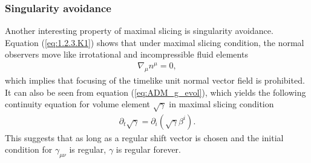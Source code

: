 \subsubsection{Singularity avoidance}
Another interesting property of maximal slicing is singularity avoidance.
Equation (\ref{eq:1.2.3.K1}) shows that under maximal slicing condition,
the normal observers move like irrotational and incompressible fluid elements
\begin{align}
    \nabla_\mu n^{\mu} = 0,
\end{align}
which implies that focusing of the timelike unit normal vector field is prohibited.
It can also be seen from equation (\ref{eq:ADM_g_evol}),
which yields the following continuity equation for volume element $\sqrt{\gamma}$ in maximal slicing condition
\begin{align}\label{eq:volume_evol}
    \partial_t \sqrt{\gamma} = \partial_i \left( \sqrt{\gamma} \beta^i \right).
\end{align}
This suggests that as long as a regular shift vector is chosen
and the initial condition for $\gamma_{\mu\nu}$ is regular,
$\gamma$ is regular forever.

